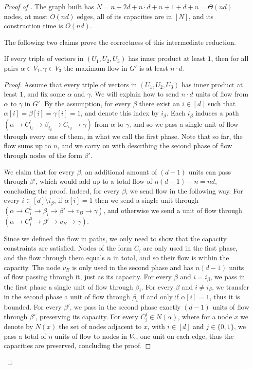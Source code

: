 \begin{proof}[Proof of ]
The graph built has $N=n+2d+n\cdot d+n+1+d+n=\Theta(nd)$ nodes, at most $O(nd)$ edges, all of its capacities are in $[N]$, and its construction time is $O(nd)$.

\medskip
The following two claims
prove the correctness of this intermediate reduction.

\begin{claim}\label{claim:simple}
If every triple of vectors in $(U_1, U_2, U_3)$ has inner product at least $1$, then for all pairs $\alpha \in V_1,\gamma \in V_3$ the maximum-flow in $G'$ is at least $n\cdot d$.
\end{claim}

\begin{proof}
Assume that every triple of vectors in $(U_1, U_2, U_3)$ has inner product at least $1$, and fix some $\alpha$ and $\gamma$.
We will explain how to send $n\cdot d$ units of flow from $\alpha$ to $\gamma$ in $G'$.
By the assumption, for every $\beta$ there exist an $i\in [d]$ such that $\alpha[i]=\beta[i]=\gamma[i]=1$, and denote this index by $i_{\beta}$.
Each $i_{\beta}$ induces a path $(\alpha\rightarrow C_{i_{\beta}}^1\rightarrow\beta_{i_{\beta}}\rightarrow C_{i_{\beta}}\rightarrow \gamma)$ from $\alpha$ to $\gamma$, and so we pass a single unit of flow through every one of them, in what we call the first phase. Note that so far, the flow sums up to $n$, and we carry on with describing the second phase of flow through nodes of the form $\beta'$.

We claim that for every $\beta$, an additional amount of $(d-1)$ units can pass through $\beta'$, which would add up to a total flow of $n(d-1)+n=nd$, concluding the proof. Indeed, for every $\beta$, we send flow in the following way. For every $i\in [d]\setminus i_{\beta}$, if $\alpha[i]=1$ then we send a single unit through $(\alpha\rightarrow C_i^1\rightarrow \beta_i\rightarrow \beta' \rightarrow  v_B\rightarrow \gamma)$, and otherwise we send a unit of flow through $(\alpha\rightarrow C_i^0\rightarrow \beta'\rightarrow v_B\rightarrow \gamma)$.

Since we defined the flow in paths, we only need to show that the capacity constraints are satisfied. Nodes of the form $C_i$ are only used in the first phase, and the flow through them equals $n$ in total, and so their flow is within the capacity. The node $v_B$ is only used in the second phase and has $n(d-1)$ units of flow passing through it, just as its capacity.
For every $\beta$ and $i=i_{\beta}$, we pass in the first phase a single unit of flow through $\beta_i$. For every $\beta$ and $i\neq i_{\beta}$, we transfer in the second phase a unit of flow through $\beta_i$ if and only if $\alpha[i]=1$, thus it is bounded. For every $\beta'$, we pass in the second phase exactly $(d-1)$ units of flow through $\beta'$, preserving its capacity. For every $C_i^j\in N(\alpha)$,
where for a node $x$ we denote by $N(x)$ the set of nodes adjacent to $x$,
with $i\in [d]$ and $j\in \{0,1\}$, we pass a total of $n$ units of flow to nodes in $V_2$, one unit on each edge, thus the capacities are preserved, concluding the proof.
\end{proof}


\end{proof}
